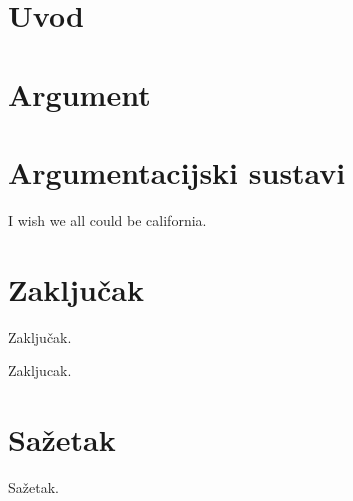 \documentclass[times, utf8, seminar]{fer}
\begin{document}
% 
\author{Student: Filip Boltužić}
% 
 
\maketitle
 
\tableofcontents
 
\chapter{Uvod} 
 
\chapter{Argument} 
 
\chapter{Argumentacijski sustavi} 

I wish \citep{chesnevar2006towards} we all could be california.

\chapter{Zaključak} Zaključak.

Zakljucak. 

 

\chapter{Sažetak} Sažetak.
\end{document}
